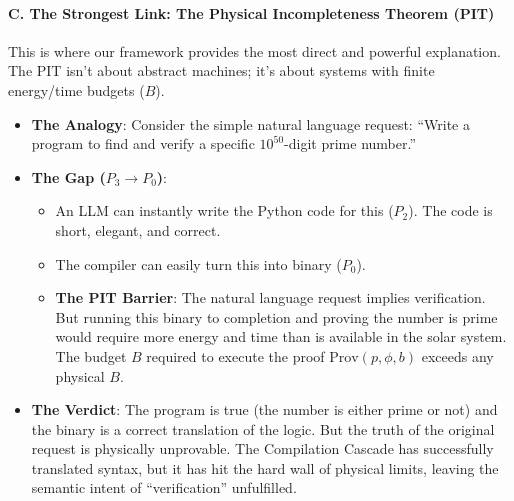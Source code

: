 \documentclass[11pt,letterpaper]{article}
\begin{document}
\begin{itemize}
\paragraph{C. The Strongest Link: The Physical Incompleteness Theorem (PIT)}
This is where our framework provides the most direct and powerful explanation. The PIT isn’t about abstract machines; it’s about systems with finite energy/time budgets ($B$).
\begin{itemize}
    \item \textbf{The Analogy}: Consider the simple natural language request: “Write a program to find and verify a specific $10^{50}$-digit prime number.”
    \item \textbf{The Gap ($P_3 \to P_0$)}:
    \begin{itemize}
        \item An LLM can instantly write the Python code for this ($P_2$). The code is short, elegant, and correct.
        \item The compiler can easily turn this into binary ($P_0$).
        \item \textbf{The PIT Barrier}: The natural language request implies verification. But running this binary to completion and proving the number is prime would require more energy and time than is available in the solar system. The budget $B$ required to execute the proof $\text{Prov}(p, \phi, b)$ exceeds any physical $B$.
    \end{itemize}
    \item \textbf{The Verdict}: The program is true (the number is either prime or not) and the binary is a correct translation of the logic. But the truth of the original request is physically unprovable. The Compilation Cascade has successfully translated syntax, but it has hit the hard wall of physical limits, leaving the semantic intent of “verification” unfulfilled.
\end{itemize}


\end{itemize}
\end{document}
